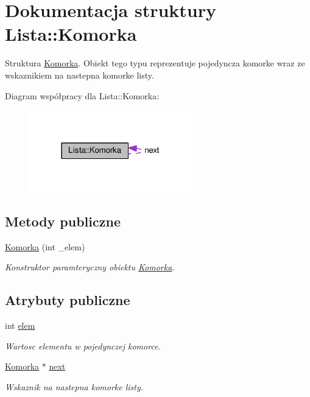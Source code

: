 \hypertarget{struct_lista_1_1_komorka}{\section{Dokumentacja struktury Lista\-:\-:Komorka}
\label{struct_lista_1_1_komorka}
}


Struktura \hyperlink{struct_lista_1_1_komorka}{Komorka}. Obiekt tego typu reprezentuje pojedyncza komorke wraz ze wskaznikiem na nastepna komorke listy.  




Diagram współpracy dla Lista\-:\-:Komorka\-:\nopagebreak
\begin{figure}[H]
\begin{center}
\leavevmode
\includegraphics[width=201pt]{struct_lista_1_1_komorka__coll__graph}
\end{center}
\end{figure}
\subsection*{Metody publiczne}
\begin{DoxyCompactItemize}
\item 
\hyperlink{struct_lista_1_1_komorka_a1843c3c4ae9752cea90cfa21076f3e9c}{Komorka} (int \-\_\-elem)
\begin{DoxyCompactList}\small\item\em Konstruktor paramteryczny obiektu \hyperlink{struct_lista_1_1_komorka}{Komorka}. \end{DoxyCompactList}\end{DoxyCompactItemize}
\subsection*{Atrybuty publiczne}
\begin{DoxyCompactItemize}
\item 
int \hyperlink{struct_lista_1_1_komorka_aeb683e1dce8a8c096cc54a6645137411}{elem}
\begin{DoxyCompactList}\small\item\em Wartosc elementu w pojedynczej komorce. \end{DoxyCompactList}\item 
\hyperlink{struct_lista_1_1_komorka}{Komorka} $\ast$ \hyperlink{struct_lista_1_1_komorka_aa04e9d2ed0260f2adbff6855f7bcd77e}{next}
\begin{DoxyCompactList}\small\item\em Wskaznik na nastepna komorke listy. \end{DoxyCompactList}\end{DoxyCompactItemize}


